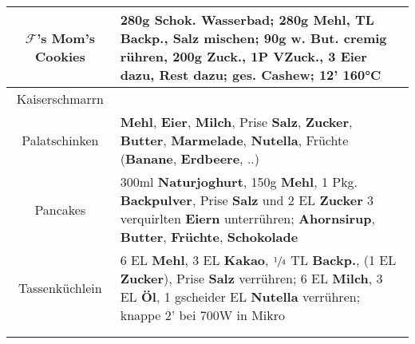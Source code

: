 \documentclass{article}
\begin{document}
\begin{tabular}{c|l}
        $\mathcal{F}$'s Mom's Cookies & 280g \textbf{Schok.} Wasserbad; 280g \textbf{Mehl}, TL \textbf{Backp.}, \textbf{Salz} mischen; 90g w. \textbf{But.} cremig rühren, 200g \textbf{Zuck.}, 1P \textbf{VZuck.}, 3 \textbf{Eier} dazu, Rest dazu; \textbf{ges. Cashew}; 12' 160°C
        \\\hline

        Kaiserschmarrn & \\\hline
		
        Palatschinken&	\textbf{Mehl}, \textbf{Eier}, \textbf{Milch}, Prise \textbf{Salz}, \textbf{Zucker}, \textbf{Butter}, \textbf{Marmelade}, \textbf{Nutella}, Früchte (\textbf{Banane}, \textbf{Erdbeere}, ..)\\\hline

        Pancakes & 300ml \textbf{Naturjoghurt}, 150g \textbf{Mehl}, 1 Pkg. \textbf{Backpulver}, Prise \textbf{Salz} und 2 EL \textbf{Zucker} 3 verquirlten \textbf{Eiern} unterrühren; \textbf{Ahornsirup}, \textbf{Butter}, \textbf{Früchte}, \textbf{Schokolade}\\\hline

        Tassenküchlein & 6 EL \textbf{Mehl}, 3 EL \textbf{Kakao}, $\sfrac{1}{4}$ TL \textbf{Backp.}, (1 EL \textbf{Zucker}), Prise \textbf{Salz} verrühren; 6 EL \textbf{Milch}, 3 EL \textbf{Öl}, 1 gscheider EL \textbf{Nutella} verrühren; knappe 2' bei 700W in Mikro
        \\\hline



        \\\hline
        \\\hline

	\end{tabular}
\end{document}
